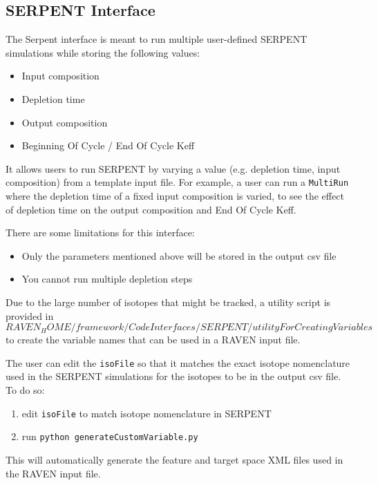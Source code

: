 
\subsection{SERPENT Interface}
\label{subsec:serpentInterface}
The Serpent interface is meant to run multiple user-defined SERPENT simulations
while storing the following values: 
\begin{itemize}
\item Input composition
\item Depletion time
\item Output composition
\item Beginning Of Cycle / End Of Cycle Keff
\end{itemize}

It allows users to run SERPENT by varying a value
(e.g. depletion time, input composition) from a template input file.
For example, a user can run a \texttt{MultiRun} where the depletion
time of a fixed input composition is varied, to see the effect of
depletion time on the output composition and End Of Cycle Keff.

There are some limitations for this interface:
\begin{itemize}
\item Only the parameters mentioned above will be stored in the output csv file
\item You cannot run multiple depletion steps
\end{itemize}

Due to the large number of isotopes that might be tracked,
a utility script is provided in
$RAVEN_HOME/framework/CodeInterfaces/SERPENT/utilityForCreatingVariables$
to create the variable names that can be used in a RAVEN input file.

The user can edit the \texttt{isoFile} so that it
matches the exact isotope nomenclature used in the SERPENT simulations for the isotopes
to be in the output csv file. To do so:

\begin{enumerate}
\item edit \texttt{isoFile} to match isotope nomenclature in SERPENT
\item run \texttt{python generateCustomVariable.py}
\end{enumerate}

This will automatically generate the feature and target space XML files
used in the RAVEN input file.


